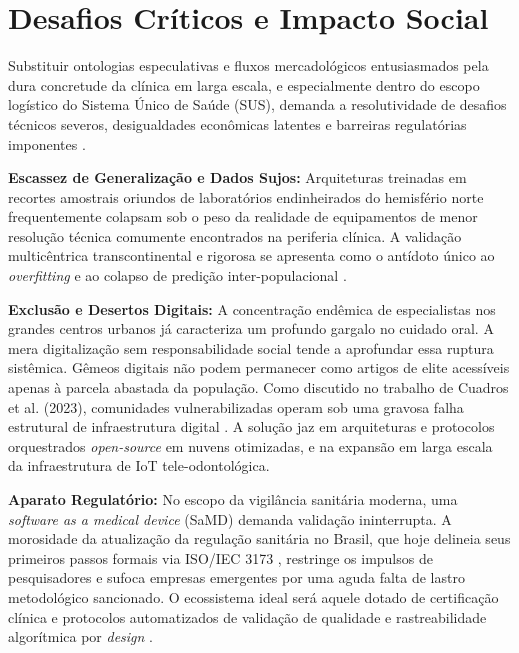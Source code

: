 \section{Desafios Críticos e Impacto Social}
\label{sec:ia-desafios}

Substituir ontologias especulativas e fluxos mercadológicos entusiasmados pela dura concretude da clínica em larga escala, e especialmente dentro do escopo logístico do Sistema Único de Saúde (SUS), demanda a resolutividade de desafios técnicos severos, desigualdades econômicas latentes e barreiras regulatórias imponentes \cite{frota2025, du2020}.

\textbf{Escassez de Generalização e Dados Sujos:} Arquiteturas treinadas em recortes amostrais oriundos de laboratórios endinheirados do hemisfério norte frequentemente colapsam sob o peso da realidade de equipamentos de menor resolução técnica comumente encontrados na periferia clínica. A validação multicêntrica transcontinental e rigorosa se apresenta como o antídoto único ao \textit{overfitting} e ao colapso de predição inter-populacional \cite{khoshfekr2025}.

\textbf{Exclusão e Desertos Digitais:} A concentração endêmica de especialistas nos grandes centros urbanos já caracteriza um profundo gargalo no cuidado oral. A mera digitalização sem responsabilidade social tende a aprofundar essa ruptura sistêmica. Gêmeos digitais não podem permanecer como artigos de elite acessíveis apenas à parcela abastada da população. Como discutido no trabalho de Cuadros et al. (2023), comunidades vulnerabilizadas operam sob uma gravosa falha estrutural de infraestrutura digital \cite{cuadros2023}. A solução jaz em arquiteturas e protocolos orquestrados \textit{open-source} em nuvens otimizadas, e na expansão em larga escala da infraestrutura de IoT tele-odontológica.


\textbf{Aparato Regulatório:} No escopo da vigilância sanitária moderna, uma \textit{software as a medical device} (SaMD) demanda validação ininterrupta. A morosidade da atualização da regulação sanitária no Brasil, que hoje delineia seus primeiros passos formais via ISO/IEC 3173 \cite{khoshfekr2025}, restringe os impulsos de pesquisadores e sufoca empresas emergentes por uma aguda falta de lastro metodológico sancionado. O ecossistema ideal será aquele dotado de certificação clínica e protocolos automatizados de validação de qualidade e rastreabilidade algorítmica por \textit{design} \cite{aisociety2026}.
